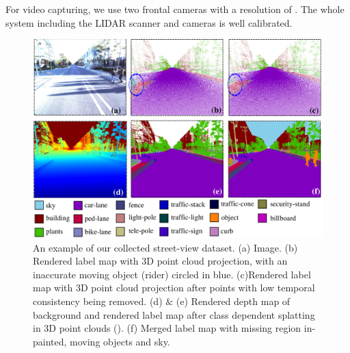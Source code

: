 For video capturing, we use two frontal cameras with a resolution of . The whole system including the LIDAR scanner and cameras is well calibrated.

\begin{figure}[t]
\begin{center}
\includegraphics[width=\linewidth]{fig/dataset.pdf}
\vspace{-1.7\baselineskip}
\end{center}
	\caption{An example of our collected street-view dataset. (a) Image. (b) Rendered label map with 3D point cloud projection, with an inaccurate moving object (rider) circled in blue. (c)Rendered label map with 3D point cloud projection after points with low temporal consistency being removed. (d) $\&$ (e) Rendered depth map of background and rendered label map after class dependent splatting in 3D point clouds (). (f) Merged label map with missing region in-painted, moving objects and sky.}
\label{fig:data}
\vspace{-1.3\baselineskip}
\end{figure}

